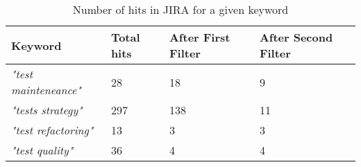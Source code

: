 \begin{table}[htb]
	\centering
	\caption{Number of hits in JIRA for a given keyword}
	\label{tab:jiraMiningResults}
	\begin{tabulary}{\textwidth}{|L|L|L|L|}
		\hline
		\textbf{Keyword} & 
		\textbf{Total hits} &
		\textbf{After First Filter} &
		\textbf{After Second Filter}\\ \hline
		
		\textit{"test mainteneance"} &
		28 &
		18 &
		9 \\ \hline
		
		\textit{"tests strategy"} &
		297 &
		138 &
		11 \\ \hline
		
		\textit{"test refactoring"} &
		13 &
		3 &
		3 \\ \hline
		
		\textit{"test quality"} &
		36 &
		4 &
		4 \\ \hline
		

	\end{tabulary}		
\end{table}